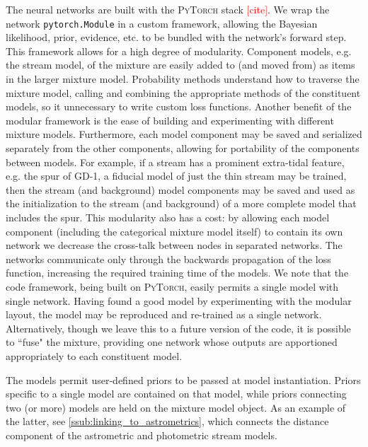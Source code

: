 \documentclass[twocolumn]{aastex631}
\newcommand{\package}[1]{\textsc{#1}}
\newcommand{\stream}[1]{#1}
\newcommand{\TODO}[1]{{\textcolor{red}{#1}}}
\begin{document}
        The neural networks are built with the \package{PyTorch} stack \TODO{[cite]}. We wrap the network \texttt{pytorch.Module} in a custom framework, allowing the Bayesian likelihood, prior, evidence, etc. to be bundled with the network's forward step. This framework allows for a high degree of modularity. Component models, e.g. the stream model, of the mixture are easily added to (and moved from) as items in the larger mixture model. Probability methods understand how to traverse the mixture model, calling and combining the appropriate methods of the constituent models, so it unnecessary to write custom loss functions. 
        Another benefit of the modular framework is the ease of building and experimenting with different mixture models. Furthermore, each model component may be saved and serialized separately from the other components, allowing for
        portability of the components between models. For example, if a stream has a prominent extra-tidal feature, e.g. the spur of \stream{GD-1}, a fiducial model of just the thin stream may be trained, then the stream (and background) model components may be saved and used as the initialization to the stream (and background) of a more complete model that includes the spur. This modularity also has a cost: by allowing each model component (including the categorical mixture model itself) to contain its own network we decrease the cross-talk between nodes in separated networks. The networks communicate only through the backwards propagation of the loss function, increasing the required training time of the models. We note that the code framework, being built on \package{PyTorch}, easily permits a single model with single network. Having found a good model by experimenting with the modular layout, the model may be reproduced and re-trained as a single network. Alternatively, though we leave this to a future version of the code, it is possible to ``fuse" the mixture, providing one network whose outputs are apportioned appropriately to each constituent model.

        The models permit user-defined priors to be passed at model instantiation.
        Priors specific to a single model are contained on that model, while priors connecting two (or more) models are held on the mixture model object. As an example of the latter, see \autoref{ssub:linking_to_astrometrics}, which connects the distance component of the astrometric and photometric stream models.
\end{document}
